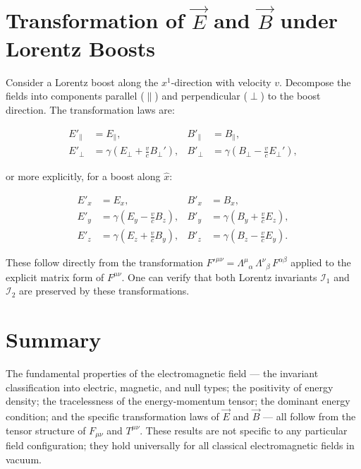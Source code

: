 \section{Transformation of $\vec{E}$ and $\vec{B}$ under Lorentz Boosts}

Consider a Lorentz boost along the $x^1$-direction with velocity $v$. Decompose the fields into components parallel ($\parallel$) and perpendicular ($\perp$) to the boost direction. The transformation laws are:

\begin{align}
E'_\parallel &= E_\parallel, & B'_\parallel &= B_\parallel, \\
E'_\perp &= \gamma(E_\perp + \tfrac{v}{c}B_\perp'), & B'_\perp &= \gamma(B_\perp - \tfrac{v}{c}E_\perp'),
\end{align}

or more explicitly, for a boost along $\hat{x}$:

\begin{align}
E'_x &= E_x, & B'_x &= B_x, \\
E'_y &= \gamma(E_y - \tfrac{v}{c}B_z), & B'_y &= \gamma(B_y + \tfrac{v}{c}E_z), \\
E'_z &= \gamma(E_z + \tfrac{v}{c}B_y), & B'_z &= \gamma(B_z - \tfrac{v}{c}E_y).
\end{align}

These follow directly from the transformation $F'^{\mu\nu} = \Lambda^\mu{}_\alpha\,\Lambda^\nu{}_\beta\,F^{\alpha\beta}$ applied to the explicit matrix form of $F^{\mu\nu}$. One can verify that both Lorentz invariants $\mathcal{I}_1$ and $\mathcal{I}_2$ are preserved by these transformations.

\section{Summary}

The fundamental properties of the electromagnetic field --- the invariant classification into electric, magnetic, and null types; the positivity of energy density; the tracelessness of the energy-momentum tensor; the dominant energy condition; and the specific transformation laws of $\vec{E}$ and $\vec{B}$ --- all follow from the tensor structure of $F_{\mu\nu}$ and $T^{\mu\nu}$. These results are not specific to any particular field configuration; they hold universally for all classical electromagnetic fields in vacuum.
